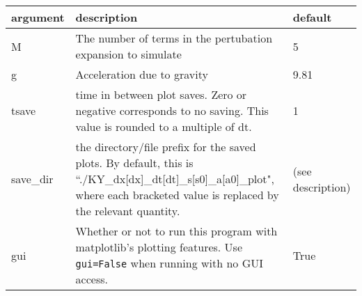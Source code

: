 \documentclass[10pt,a4paper]{article}
\newenvironment{optarglist}
    {\begin{center}
    \begin{tabular}{l|p{10cm}|l}
    argument & description & default\\
    \hline
    }
    { 
    \end{tabular} 
    \end{center}
    }
\begin{document}
\begin{optarglist}
    M           &
           The number of terms in the pertubation expansion to simulate& 5\\\hline

    g              &
           Acceleration due to gravity&9.81 \\\hline

    tsave    & 
           time in between plot saves. Zero or negative corresponds to no
            saving. This value is rounded to a multiple of dt.& 1\\\hline
    
    save\_dir     &  
           the directory/file prefix for the saved plots. By default, this is ``./KY\_dx[dx]\_dt[dt]\_s[s0]\_a[a0]\_plot", where each
bracketed value is replaced by the relevant quantity. & (see description)\\\hline

 gui &
Whether or not to run this program with matplotlib's plotting features. Use \texttt{gui=False} when running with no GUI access. & True
\end{optarglist}
\end{document}
